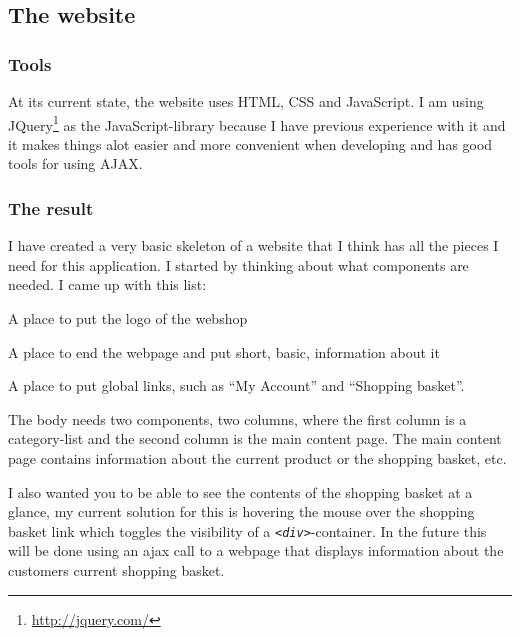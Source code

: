 \documentclass[12pt, a4paper,titlepage]{article}
\begin{document}
\subsection{The website}

\subsubsection{Tools}
At its current state, the website uses HTML, CSS and JavaScript. 
I am using JQuery\footnote{\url{http://jquery.com/}} as the JavaScript-library
because I have previous experience with it and it makes things alot easier and
more convenient when developing and has good tools for using AJAX.

\subsubsection{The result}

I have created a very basic skeleton of a website that I think has all the pieces
I need for this application. I started by thinking about what components are
needed. I came up with this list:
\begin{description}
\setlength\itemsep{-5pt}
\item[Header] A place to put the logo of the webshop
\item[Footer] A place to end the webpage and put short, basic, information
		about it
\item[Navigation] A place to put global links, such as ``My Account'' and ``Shopping basket''.
\item[Body] The body needs two components, two columns, where the first
	column is a category-list and the second column is the main content page.
	The main content page contains information about the current product
	or the shopping basket, etc.
\end{description}

I also wanted you to be able to see the contents of the shopping basket at a
glance, my current solution for this is hovering the mouse over the shopping
basket link which toggles the visibility of a \emph{\lstinline{<div>}}-container.
In the future this will be done using an ajax call to a webpage that displays
information about the customers current shopping basket.
\end{document}
